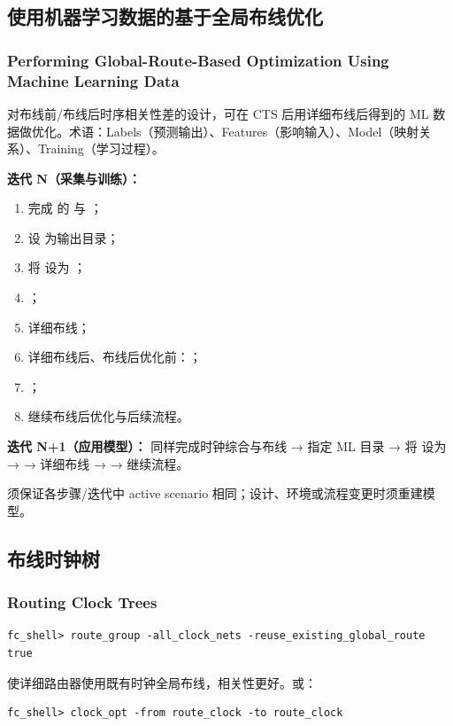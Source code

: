 \subsection{使用机器学习数据的基于全局布线优化}
\subsubsection*{Performing Global-Route-Based Optimization Using Machine Learning Data}

对布线前/布线后时序相关性差的设计，可在 CTS 后用详细布线后得到的 ML 数据做优化。术语：Labels（预测输出）、Features（影响输入）、Model（映射关系）、Training（学习过程）。

\textbf{迭代 N（采集与训练）：}
\begin{enumerate}
  \item 完成  的  与 ；
  \item 设  为输出目录；
  \item 将  设为 ；
  \item {}；
  \item 详细布线；
  \item 详细布线后、布线后优化前：；
  \item {}；
  \item 继续布线后优化与后续流程。
\end{enumerate}

\textbf{迭代 N+1（应用模型）：} 同样完成时钟综合与布线 → 指定 ML 目录 → 将  设为  →  → 详细布线 →  → 继续流程。

须保证各步骤/迭代中 active scenario 相同；设计、环境或流程变更时须重建模型。

\subsection{布线时钟树}
\subsubsection*{Routing Clock Trees}

\begin{lstlisting}
fc_shell> route_group -all_clock_nets -reuse_existing_global_route true
\end{lstlisting}
 使详细路由器使用既有时钟全局布线，相关性更好。或：
\begin{lstlisting}
fc_shell> clock_opt -from route_clock -to route_clock
\end{lstlisting}


